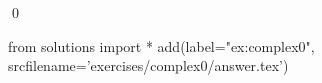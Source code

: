 
\begin{ex} 
  \label{ex:complex0}
  
  \qed
\end{ex} 
\begin{python0}
from solutions import *
add(label="ex:complex0",
    srcfilename='exercises/complex0/answer.tex') 
\end{python0}
